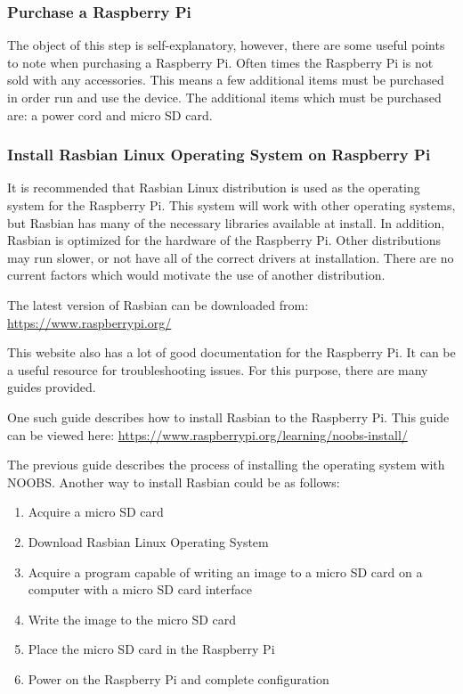 \documentclass{article}	%
\begin{document}
\begin{multicols}{2}
\subsubsection{Purchase a Raspberry Pi}
The object of this step is self-explanatory, however,
there are some useful points to note when purchasing
a Raspberry Pi.
Often times the Raspberry Pi is not sold with any accessories.
This means a few additional items must be purchased
in order run and use the device.
The additional items which must be purchased are:
a power cord and
micro SD card.

\subsubsection{Install Rasbian Linux Operating System on Raspberry Pi}
It is recommended that Rasbian Linux distribution is used
as the operating system for the Raspberry Pi.
This system will work with other operating systems,
but Rasbian has many of the necessary libraries available
at install.
In addition, Rasbian is optimized for the hardware of the Raspberry Pi.
Other distributions may run slower, or
not have all of the correct drivers at installation.
There are no current factors which would motivate the
use of another distribution.

The latest version of Rasbian can be downloaded from:
\url{https://www.raspberrypi.org/}

This website also has a lot of good documentation for
the Raspberry Pi.
It can be a useful resource for troubleshooting issues.
For this purpose,
there are many guides provided.

One such guide describes how to install Rasbian to the Raspberry Pi.
This guide can be viewed here:
\url{https://www.raspberrypi.org/learning/noobs-install/}

The previous guide describes the process
of installing the operating system with NOOBS.
Another way to install Rasbian could be as follows:
\begin{enumerate}
\item Acquire a micro SD card 
\item Download Rasbian Linux Operating System
\item Acquire a program capable of writing an image
    to a micro SD card on a computer with a micro SD card interface
\item Write the image to the micro SD card
\item Place the micro SD card in the Raspberry Pi
\item Power on the Raspberry Pi and complete configuration
\end{enumerate}


\end{multicols}
\end{document}
